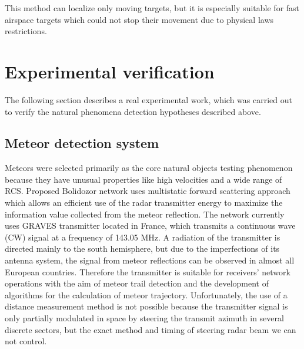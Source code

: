 \documentclass[twoside]{ctuthesis}
\theoremstyle{plain}
\theoremstyle{definition}
\theoremstyle{note}
\begin{document}
This method can localize only moving targets, but it is especially suitable for fast airspace targets which could not stop their movement due to physical laws restrictions. 

\chapter{Experimental verification}

The following section describes a real experimental work, which was carried out to verify the natural phenomena detection hypotheses described above. 

\section{Meteor detection system}

Meteors were selected primarily as the core natural objects testing phenomenon because they have unusual properties like high velocities and a wide range of RCS.
Proposed Bolidozor network \cite{Bolidozor} uses multistatic forward scattering approach which allows an efficient use of the radar transmitter energy to maximize the information value collected from the meteor reflection.
The network currently uses GRAVES \cite{GRAVES_radar} transmitter located in France, which transmits a continuous wave (CW) signal at a frequency of 143.05 MHz. A radiation of the transmitter is directed mainly to the south hemisphere, but due to the imperfections of its antenna system, the signal from meteor reflections can be observed in almost all European countries. Therefore the transmitter is suitable for receivers' network operations with the aim of meteor trail detection and the development of algorithms for the calculation of meteor trajectory. Unfortunately, the use of a distance measurement method is not possible because the transmitter signal is only partially modulated in space by steering the transmit azimuth in several discrete sectors, but the exact method and timing of steering radar beam we can not control. 
\end{document}
